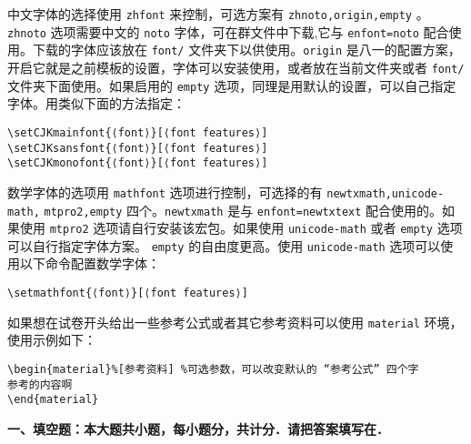 \documentclass[hideanswer=false,
enfont=newtxtext,
zhfont=empty,
mathfont=newtxmath,
]{cmcthesis}
\begin{document}
中文字体的选择使用 \verb|zhfont| 来控制，可选方案有 \verb|zhnoto,origin,empty| 。\verb|zhnoto| 选项需要中文的 \verb|noto| 字体，可在群文件中下载,它与 \verb|enfont=noto| 配合使用。下载的字体应该放在 \verb|font/| 文件夹下以供使用。\verb|origin| 是八一的配置方案，开启它就是之前模板的设置，字体可以安装使用，或者放在当前文件夹或者 \verb|font/| 文件夹下面使用。如果启用的 \verb|empty| 选项，同理是用默认的设置，可以自己指定字体。用类似下面的方法指定：
\begin{lstlisting}[style=tex]
\setCJKmainfont{⟨font⟩}[⟨font features⟩]
\setCJKsansfont{⟨font⟩}[⟨font features⟩]
\setCJKmonofont{⟨font⟩}[⟨font features⟩]
\end{lstlisting}

数学字体的选项用 \verb|mathfont| 选项进行控制，可选择的有 \verb|newtxmath,unicode-math,| \verb|mtpro2,empty| 四个。\verb|newtxmath| 是与 \verb|enfont=newtxtext| 配合使用的。如果使用 \verb|mtpro2| 选项请自行安装该宏包。如果使用 \verb|unicode-math| 或者 \verb|empty| 选项可以自行指定字体方案。 \verb|empty| 的自由度更高。使用 \verb|unicode-math| 选项可以使用以下命令配置数学字体：
\begin{lstlisting}[style=tex]
\setmathfont{⟨font⟩}[⟨font features⟩]
\end{lstlisting}

如果想在试卷开头给出一些参考公式或者其它参考资料可以使用 \verb|material| 环境，使用示例如下：
\begin{lstlisting}[style=tex]
\begin{material}%[参考资料] %可选参数，可以改变默认的 “参考公式” 四个字
参考的内容啊
\end{material}
\end{lstlisting}
	
	{\bfseries 一、填空题：本大题共{}小题，每小题{}分，共计{}分．请把答案填写在．}
\end{document}
